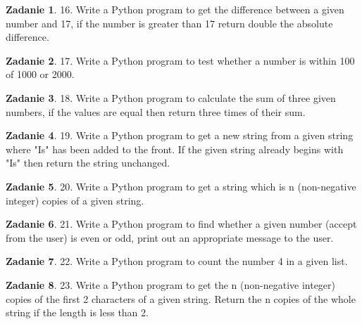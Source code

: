 \documentclass[11pt]{article}
\theoremstyle{definition}
\newtheorem{zadanie}{Zadanie}
\begin{document}
\begin{zadanie}


16. Write a Python program to get the difference between a given number and 17, if the number is greater than 17 return double the absolute difference. 

\end{zadanie}

\begin{zadanie}


17. Write a Python program to test whether a number is within 100 of 1000 or 2000. 

\end{zadanie}

\begin{zadanie}


18. Write a Python program to calculate the sum of three given numbers, if the values are equal then return three times of their sum. 

\end{zadanie}

\begin{zadanie}


19. Write a Python program to get a new string from a given string where "Is" has been added to the front. If the given string already begins with "Is" then return the string unchanged. 

\end{zadanie}

\begin{zadanie}


20. Write a Python program to get a string which is n (non-negative integer) copies of a given string. 

\end{zadanie}

\begin{zadanie}


21. Write a Python program to find whether a given number (accept from the user) is even or odd, print out an appropriate message to the user. 

\end{zadanie}

\begin{zadanie}


22. Write a Python program to count the number 4 in a given list. 

\end{zadanie}

\begin{zadanie}


23. Write a Python program to get the n (non-negative integer) copies of the first 2 characters of a given string. Return the n copies of the whole string if the length is less than 2. 

\end{zadanie}
\end{document}
